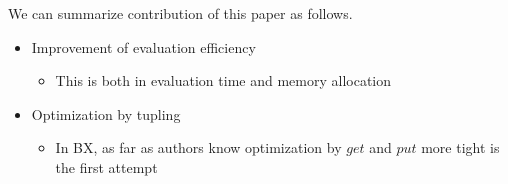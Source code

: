 We can summarize contribution of this paper as follows.

\begin{itemize}
\item Improvement of evaluation efficiency
  \begin{itemize}
  \item This is both in evaluation time and memory allocation
  \end{itemize}
\item Optimization by tupling
  \begin{itemize}
  \item In BX, as far as authors know optimization by $get$ and $put$ more tight is the first attempt
  \end{itemize}
\end{itemize}



